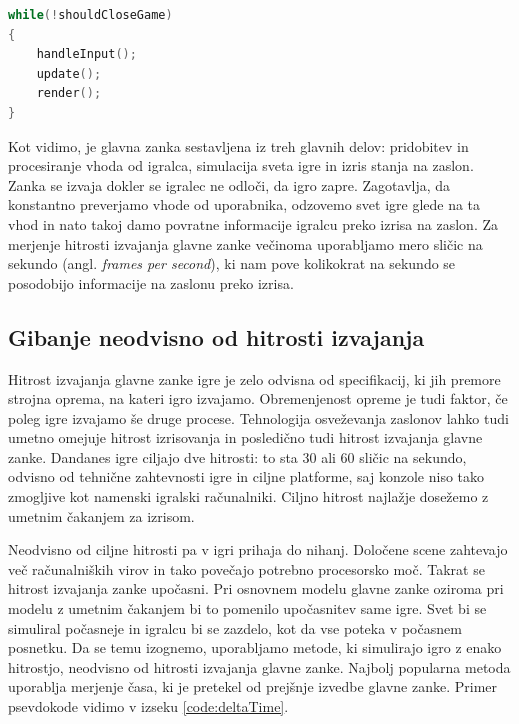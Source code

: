 \documentclass[12pt,a4paper,twoside]{book}
\begin{document}
\begin{lstlisting}[label=code:glavnaZanka, language=C++, caption=Glavna zanka igre]
while(!shouldCloseGame)
{
	handleInput();
	update();
	render();
}
\end{lstlisting}

Kot vidimo, je glavna zanka sestavljena iz treh glavnih delov: pridobitev in procesiranje vhoda od igralca, simulacija sveta igre in izris stanja na zaslon. Zanka se izvaja dokler se igralec ne odloči, da igro zapre. Zagotavlja, da konstantno preverjamo vhode od uporabnika, odzovemo svet igre glede na ta vhod in nato takoj damo povratne informacije igralcu preko izrisa na zaslon. Za merjenje hitrosti izvajanja glavne zanke večinoma uporabljamo mero sličic na sekundo (angl. \textit{frames per second}), ki nam pove kolikokrat na sekundo se posodobijo informacije na zaslonu preko izrisa.

\subsection{Gibanje neodvisno od hitrosti izvajanja}
Hitrost izvajanja glavne zanke igre je zelo odvisna od specifikacij, ki jih premore strojna oprema, na kateri igro izvajamo. Obremenjenost opreme je tudi faktor, če poleg igre izvajamo še druge procese. Tehnologija osveževanja zaslonov lahko tudi umetno omejuje hitrost izrisovanja in posledično tudi hitrost izvajanja glavne zanke. Dandanes igre ciljajo dve hitrosti: to sta 30 ali 60 sličic na sekundo, odvisno od tehnične zahtevnosti igre in ciljne platforme, saj konzole niso tako zmogljive kot namenski igralski računalniki. Ciljno hitrost najlažje dosežemo z umetnim čakanjem za izrisom. 

Neodvisno od ciljne hitrosti pa v igri prihaja do nihanj. Določene scene zahtevajo več računalniških virov in tako povečajo potrebno procesorsko moč. Takrat se hitrost izvajanja zanke upočasni. Pri osnovnem modelu glavne zanke oziroma pri modelu z umetnim čakanjem bi to pomenilo upočasnitev same igre. Svet bi se simuliral počasneje in igralcu bi se zazdelo, kot da vse poteka v počasnem posnetku. Da se temu izognemo, uporabljamo metode, ki simulirajo igro z enako hitrostjo, neodvisno od hitrosti izvajanja glavne zanke. Najbolj popularna metoda uporablja merjenje časa, ki je pretekel od prejšnje izvedbe glavne zanke. Primer psevdokode vidimo v izseku \ref{code:deltaTime}.
\end{document}
